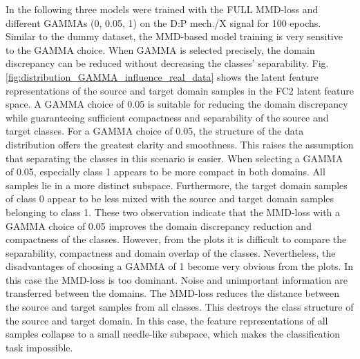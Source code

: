 In the following three models were trained with the FULL MMD-loss and different GAMMAs (0, 0.05, 1) on the D:P mech./X signal for 100 epochs. Similar to the dummy dataset, the MMD-based model training is very sensitive to the GAMMA choice. When GAMMA is selected precisely, the domain discrepancy can be reduced without decreasing the classes' separability. Fig. \ref{fig:distribution_GAMMA_influence_real_data} shows the latent feature representations of the source and target domain samples in the FC2 latent feature space. A GAMMA choice of 0.05 is suitable for reducing the domain discrepancy while guaranteeing sufficient compactness and separability of the source and target classes. For a GAMMA choice of 0.05, the structure of the data distribution offers the greatest clarity and smoothness. This raises the assumption that separating the classes in this scenario is easier. When selecting a GAMMA of 0.05, especially class 1 appears to be more compact in both domains. All samples lie in a more distinct subspace. Furthermore, the target domain samples of class 0 appear to be less mixed with the source and target domain samples belonging to class 1. These two observation indicate that the MMD-loss with a GAMMA choice of 0.05 improves the domain discrepancy reduction and compactness of the classes. However, from the plots it is difficult to compare the separability, compactness and domain overlap of the classes. Nevertheless, the disadvantages of choosing a GAMMA of 1 become very obvious from the plots. In this case the MMD-loss is too dominant. Noise and unimportant information are transferred between the domains. The MMD-loss reduces the distance between the source and target samples from all classes. This destroys the class structure of the source and target domain. In this case, the feature representations of all samples collapse to a small needle-like subspace, which makes the classification task impossible.

